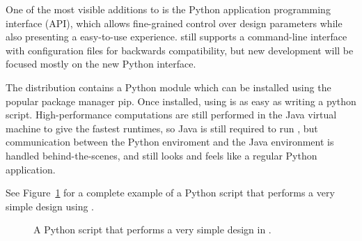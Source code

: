 
One of the most visible additions to  is the Python application programming interface (API), which allows fine-grained control over design parameters while also presenting a  easy-to-use experience.  still supports a command-line interface with configuration files for backwards compatibility, but new development will be focused mostly on the new Python interface.  

The  distribution contains a Python module which can be installed using the popular package manager {\sc pip}. Once installed, using  is as easy as writing a python script. High-performance computations are still performed in the Java virtual machine to give the fastest runtimes, so Java is still required to run , but communication between the Python enviroment and the Java environment is handled behind-the-scenes, and  still looks and feels like a regular Python application.

See Figure~\ref{fig:python} for a complete example of a Python script that performs a very simple design using .

\begin{figure}\label{fig:python}
{
	
}
\caption{A Python script that performs a very simple design in .}
\end{figure}
